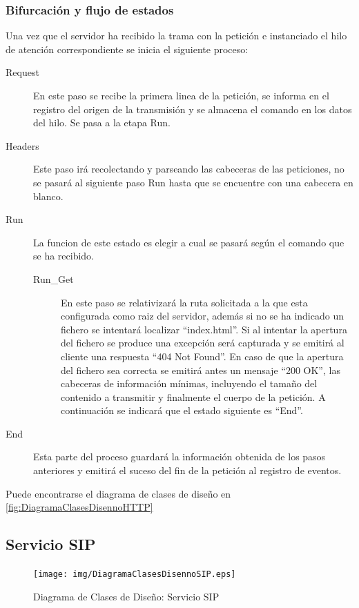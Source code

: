 \documentclass[a4paper,spanish,12pt]{book}
\begin{document}
\subsubsection{Bifurcación y flujo de estados} 
Una vez que el servidor ha recibido la trama con la petición e instanciado el hilo de atención correspondiente se inicia el siguiente proceso:
\begin{description}
	\item[Request] En este paso se recibe la primera linea de la petición, se informa en el registro del origen de la transmisión y se almacena el comando en los datos del hilo. Se pasa a la etapa Run.
	\item[Headers] Este paso irá recolectando y parseando las cabeceras de las peticiones, no se pasará al siguiente paso Run hasta que se encuentre con una cabecera en blanco.
	\item[Run] La funcion de este estado es elegir a cual se pasará según el comando que se ha recibido.
	\begin{description}
		\item[Run\_Get] En este paso se relativizará la ruta solicitada a la que esta configurada como raiz del servidor, además si no se ha indicado un fichero se intentará localizar ``index.html''. Si al intentar la apertura del fichero se produce una excepción será capturada y se emitirá al cliente una respuesta ``404 Not Found''. En caso de que la apertura del fichero sea correcta se emitirá antes un mensaje ``200 OK'', las cabeceras de información mínimas, incluyendo el tamaño del contenido a transmitir y finalmente el cuerpo de la petición. A continuación se indicará que el estado siguiente es ``End''.
	\end{description}
	\item[End] Esta parte del proceso guardará la información obtenida de los pasos anteriores y emitirá el suceso del fin de la petición al registro de eventos.
\end{description}
Puede encontrarse el diagrama de clases de diseño en \ref{fig:DiagramaClasesDisennoHTTP} 
\subsection{Servicio SIP}
\begin{figure}[h]
		\begin{center}
				\texttt{[image: img/DiagramaClasesDisennoSIP.eps]}	
			\end{center}
			\caption{Diagrama de Clases de Diseño: Servicio SIP}
			  \label{fig:DiagramaClasesDisennoSIP}
\end{figure}
\end{document}
